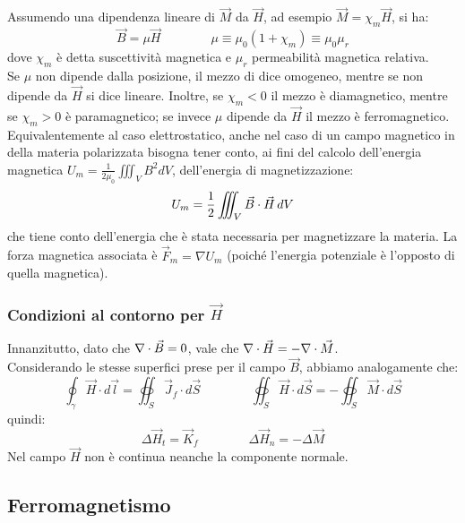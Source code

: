 %
Assumendo una dipendenza lineare di $ \vec{M} $ da $ \vec{H} $, ad esempio $ \vec{M} = \chi_m \vec{H} $, si ha:
\begin{equation}
	\vec{B} = \mu\vec{H} \qquad\qquad \mu \equiv \mu_0 (1 + \chi_m) \equiv \mu_0 \mu_r
	\label{eq:24}
\end{equation}
dove $ \chi_m $ è detta suscettività magnetica e $ \mu_r $ permeabilità magnetica relativa. \\ 
%
Se $ \mu $ non dipende dalla posizione, il mezzo di dice omogeneo, mentre se non dipende da $ \vec{H} $ si dice lineare. Inoltre, se $ \chi_m < 0 $ il mezzo è diamagnetico, mentre se $ \chi_m > 0 $ è paramagnetico; se invece $ \mu $ dipende da $ \vec{H} $ il mezzo è ferromagnetico. \\ 
Equivalentemente al caso elettrostatico, anche nel caso di un campo magnetico in della materia polarizzata bisogna tener conto, ai fini del calcolo dell'energia magnetica $ U_m = \frac{1}{2\mu_0}\iiint_V B^2 dV $, dell'energia di magnetizzazione:
\begin{equation}
	U_m = \frac{1}{2} \iiint_V \vec{B}\cdot\vec{H} \,dV
	\label{eq:25}
\end{equation}
che tiene conto dell'energia che è stata necessaria per magnetizzare la materia. La forza magnetica associata è $ \vec{F}_m = \nabla U_m $ (poiché l'energia potenziale è l'opposto di quella magnetica).

\subsubsection{Condizioni al contorno per $ \vec{H} $}

Innanzitutto, dato che $ \nabla\cdot\vec{B} = 0 $, vale che $ \nabla\cdot\vec{H} = -\nabla\cdot\vec{M} $. \\ 
%
Considerando le stesse superfici prese per il campo $ \vec{B} $, abbiamo analogamente che:
\begin{equation}
	\oint_{\gamma} \vec{H} \cdot d\vec{l} = \oiint_S \vec{J}_f \cdot d\vec{S} \qquad\qquad \oiint_S \vec{H}\cdot d\vec{S} =	- \oiint_S \vec{M}\cdot d\vec{S}
	\label{eq:26}
\end{equation}
quindi:
\begin{equation}
	\Delta\vec{H}_t = \vec{K}_f \qquad\qquad \Delta\vec{H}_n = - \Delta\vec{M}
	\label{eq:27}
\end{equation}
Nel campo $ \vec{H} $ non è continua neanche la componente normale.

\subsection{Ferromagnetismo}

